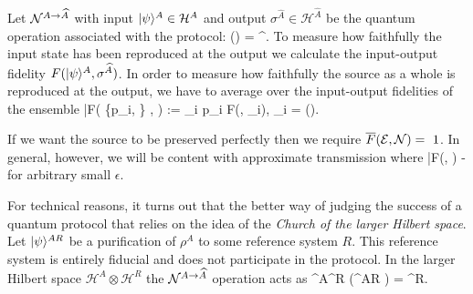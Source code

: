 \documentclass[aps,11pt,twoside,letterpaper]{article}
\def\E{\mathcal{E}}
\def\cH{\mathcal{H}}
\begin{document}
			Let ${\cal N}^{A \to \widehat{A}}$ with input $\ket{\psi}^A \in \cH^A$ and output 
		    $\sigma^{\widehat{A}} \in \cH^{\widehat{A}}$ be the quantum operation associated with the protocol:
			\be
				\cN(\proj{\psi}) = \sigma^{}.
			\ee
			To measure how faithfully the input state has been reproduced at the output we calculate the 
			input-output fidelity $F(| \psi \rangle^A, \sigma^{\widehat{A}})$. 
			In order to measure how faithfully the source as a whole is reproduced at the output, 
			we have to average over the input-output fidelities of the ensemble
			\be
				\bar{F}\!\left( \{p_i,  \}  , \cN\right) :=	\sum_i	p_i F(, \sigma_i), 
				\qquad \sigma_i = \cN().
			\ee

			If we want the source to be preserved perfectly then we require $\bar{F}(\E, \cN)=~1$.
			In general, however, we will be content with approximate transmission where
			\be \label{eqn:MixedFidDef}
				\bar{F}\!\left(\E, \cN\right)  - \epsilon
			\ee
			for arbitrary small $\epsilon$.

			
            For technical reasons, it turns out that the better way of  
            judging the success of a quantum protocol 
			that relies on the idea of the \emph{Church of the larger Hilbert space}.
			Let $| \psi \rangle^{AR}$ be a purification of $\rho^A$ to some reference system $R$. 
			This reference system is entirely fiducial and does not participate in the protocol.
			In the larger Hilbert space $\cH^A\otimes\cH^R$ the ${\cal N}^{A \to \widehat{A}}$ operation acts as
			\be
				\cN^{A\to {}}\!\!\otimes\!\id^R \!\left(\proj{\psi}^{AR} \right) = \sigma^{R}.
			\ee
			
\end{document}
